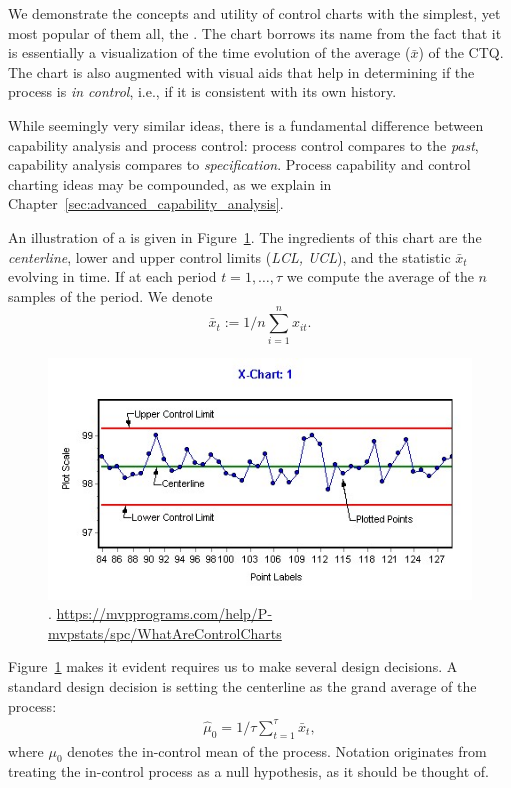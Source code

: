 We demonstrate the concepts and utility of control charts with the simplest, yet most popular of them all, the \barxChart. 
The chart borrows its name from the fact that it is essentially a visualization of the time evolution of the average ($\bar{x}$) of the CTQ. 
The chart is also augmented with visual aids that help in determining if the process is \emph{in control}, i.e., if it is consistent with its own history. 

\begin{remark}
While seemingly very similar ideas, there is a fundamental difference between capability analysis and process control:  process control compares to the \emph{past}, capability analysis compares to \emph{specification}.
Process capability and control charting ideas may be compounded, as we explain in Chapter~\ref{sec:advanced_capability_analysis}.
\end{remark}


An illustration of a \barxChart is given in Figure~\ref{fig:bar_x_chart}. 
The ingredients of this chart are the \emph{centerline}, lower and upper control limits (\emph{LCL, UCL}), and the statistic $\bar{x}_t$ evolving in time. 
If at each period $t=1,\dots,\tau$ we compute the average of the $n$ samples of the period. We denote $$\bar{x}_t:=1/n \sum_{i=1}^n x_{it}.$$

\begin{figure}[ht]
\centering
\includegraphics[height=0.3\textheight]{art/X-chartExample}
\caption[\barxChart]{\barxChart. \newline \url{https://mvpprograms.com/help/P-mvpstats/spc/WhatAreControlCharts}}
\label{fig:bar_x_chart}
\end{figure}



Figure~\ref{fig:bar_x_chart} makes it evident \barxChart requires us to make several design decisions.
A standard design decision is setting the centerline as the grand average of the process: 
\begin{align}
\label{eq:centerline}
	\hat{\mu}_0=1/\tau \sum_{t=1}^\tau \bar{x}_t,
\end{align}
where $\mu_0$ denotes the in-control mean of the process. 
Notation originates from treating the in-control process as a null hypothesis, as it should be thought of.


